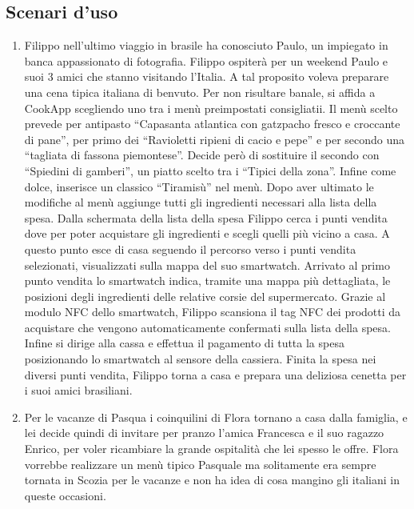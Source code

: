 \subsection{Scenari d'uso}
\begin{enumerate}

\item Filippo nell'ultimo viaggio in brasile ha conosciuto Paulo, un
impiegato in banca appassionato di fotografia. Filippo ospiterà per un
weekend Paulo
e suoi 3 amici che stanno visitando l'Italia. A tal proposito voleva
preparare una cena tipica italiana di benvuto. Per non risultare banale,
si affida a
CookApp scegliendo uno tra i menù preimpostati consigliatii. Il menù
scelto prevede per antipasto ``Capasanta atlantica con gatzpacho fresco
e croccante di pane'', per primo dei ``Ravioletti ripieni di cacio e
pepe'' e per secondo una ``tagliata di fassona piemontese''. Decide però
di sostituire il secondo con ``Spiedini di gamberi'', un piatto scelto tra i ``Tipici della
zona''. Infine come dolce, inserisce un classico ``Tiramisù'' nel menù.
Dopo aver ultimato le modifiche al menù aggiunge tutti gli ingredienti
necessari alla lista della spesa. Dalla schermata della lista della
spesa Filippo cerca i punti vendita dove per poter acquistare gli
ingredienti e scegli quelli più vicino a casa. A questo punto esce di
casa seguendo il percorso verso i punti vendita selezionati,
visualizzati sulla mappa del suo smartwatch. Arrivato al primo punto
vendita lo smartwatch indica, tramite una mappa più dettagliata, le posizioni degli ingredienti delle
relative corsie del supermercato. Grazie al modulo NFC dello smartwatch,
Filippo scansiona il tag NFC dei prodotti da acquistare che vengono
automaticamente confermati sulla lista della spesa. Infine si dirige
alla cassa e effettua il pagamento di tutta la spesa posizionando lo
smartwatch al sensore della cassiera. 
Finita la spesa nei diversi punti vendita, Filippo torna a casa e
prepara una deliziosa cenetta per i suoi amici brasiliani.


\item Per le vacanze di Pasqua i coinquilini di Flora tornano a casa dalla famiglia, e
lei decide quindi di invitare per pranzo l'amica Francesca e il suo
ragazzo Enrico, per voler ricambiare la grande ospitalità che lei spesso
le offre. Flora vorrebbe realizzare un menù tipico Pasquale ma
solitamente era sempre tornata in Scozia per le vacanze e non ha idea di
cosa mangino gli italiani in queste occasioni.


\end{enumerate}
